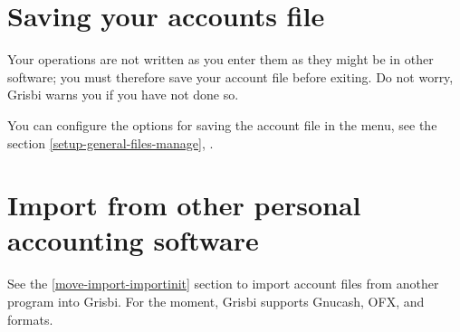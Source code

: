 

\section{Saving your accounts file\label{start-save}}

Your operations are not written as you enter them as they might be in other software; you must therefore save your account file before exiting. Do not worry, Grisbi warns you if you have not done so.

You can configure the options for saving the account file in the  menu, see the section \vref{setup-general-files-manage}, .


\section{Import from other personal accounting software}

See the \vref{move-import-importinit} section to import account files from another program into Grisbi. For the moment, Grisbi supports \gls{Gnucash}, \gls{OFX},  and  formats.


